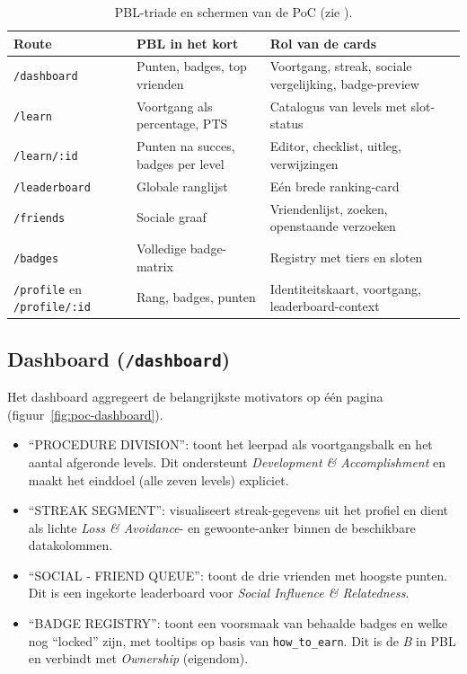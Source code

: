 \begin{table}[H]
\centering
\small
\begin{tabularx}{\textwidth}{|l|p{3.8cm}|X|}
\hline
\textbf{Route} & \textbf{PBL in het kort} & \textbf{Rol van de cards} \\
\hline
\texttt{/dashboard} & Punten, badges, top vrienden & Voortgang, streak, sociale vergelijking, badge-preview \\
\hline
\texttt{/learn} & Voortgang als percentage, PTS & Catalogus van levels met slot-status \\
\hline
\texttt{/learn/:id} & Punten na succes, badges per level & Editor, checklist, uitleg, verwijzingen \\
\hline
\texttt{/leaderboard} & Globale ranglijst & Eén brede ranking-card \\
\hline
\texttt{/friends} & Sociale graaf & Vriendenlijst, zoeken, openstaande verzoeken \\
\hline
\texttt{/badges} & Volledige badge-matrix & Registry met tiers en sloten \\
\hline
\texttt{/profile} en \texttt{/profile/:id} & Rang, badges, punten & Identiteitskaart, voortgang, leaderboard-context \\
\hline
\end{tabularx}
\caption{PBL-triade en schermen van de PoC (zie \autocite{KevinWerbach2020}).}
\label{tab:poc-pbl-schermen}
\end{table}

\subsection{Dashboard (\texttt{/dashboard})}
Het dashboard aggregeert de belangrijkste motivators op één pagina (figuur~\ref{fig:poc-dashboard}).

\begin{itemize}
    \item ``PROCEDURE DIVISION'': toont het leerpad als voortgangsbalk en het aantal afgeronde levels. Dit ondersteunt \textit{Development \& Accomplishment} en maakt het einddoel (alle zeven levels) expliciet.
    \item ``STREAK SEGMENT'': visualiseert streak-gegevens uit het profiel en dient als lichte \textit{Loss \& Avoidance}- en gewoonte-anker binnen de beschikbare datakolommen.
    \item ``SOCIAL - FRIEND QUEUE'': toont de drie vrienden met hoogste punten. Dit is een ingekorte leaderboard voor \textit{Social Influence \& Relatedness}.
    \item ``BADGE REGISTRY'': toont een voorsmaak van behaalde badges en welke nog ``locked'' zijn, met tooltips op basis van \texttt{how\_to\_earn}. Dit is de \textit{B} in PBL en verbindt met \textit{Ownership} (eigendom).
\end{itemize}

